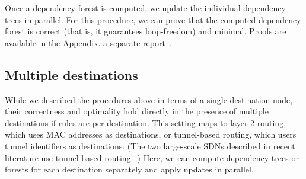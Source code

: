 

Once a dependency forest is computed, we update the individual dependency trees in parallel. For this procedure, we can prove that the computed dependency forest is correct (that is, it guarantees loop-freedom) and minimal. Proofs are available in
\iflongversion
the Appendix.
\else
a separate report~\cite{tr}.
\fi

\subsection{Multiple destinations}
\label{sec:multidest}

While we described the procedures above in terms of a single destination node, their correctness and optimality hold directly in the presence of multiple destinations if rules are per-destination. This setting maps to layer 2 routing, which uses MAC addresses as destinations, or tunnel-based routing, which users tunnel identifiers as destinations. (The two large-scale SDNs described in recent literature use tunnel-based routing~\cite{swan,b4}.) Here, we can compute dependency trees or forests for each destination separately and apply updates in parallel.


